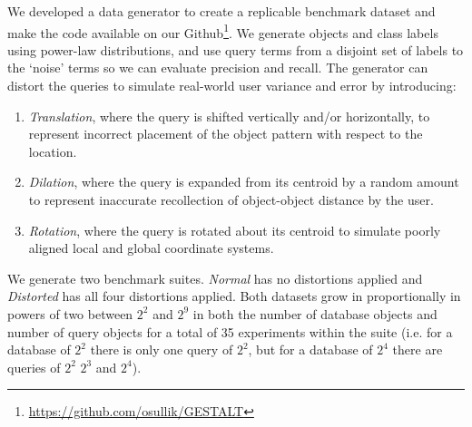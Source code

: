     \par{We developed a data generator to create a replicable benchmark dataset and make the code available on our Github\footnote{\url{https://github.com/osullik/GESTALT}}. 
    We generate objects and class labels using power-law distributions, and use query terms from a disjoint set of labels to the `noise' terms so we can evaluate precision and recall.
    The generator can distort the queries to simulate real-world user variance and error by introducing:
    \begin{enumerate}
        \item \textit{Translation}, where the query is shifted vertically and/or horizontally, to represent incorrect placement of the object pattern with respect to the location.
        \item \textit{Dilation}, where the query is expanded from its centroid by a random amount to represent inaccurate recollection of object-object distance by the user.
        \item \textit{Rotation}, where the query is rotated about its centroid to simulate poorly aligned local and global coordinate systems.
    \end{enumerate}

    We generate two benchmark suites. \textit{Normal} has no distortions applied and \textit{Distorted} has all four distortions applied. 
    Both datasets grow in proportionally in powers of two between $2^2$ and $2^9$ in both the number of database objects and number of query objects for a total of 35 experiments within the suite (i.e. for a database of $2^2$ there is only one query of $2^2$, but for a database of $2^4$ there are queries of $2^2$ $2^3$ and $2^4$).
    
}
